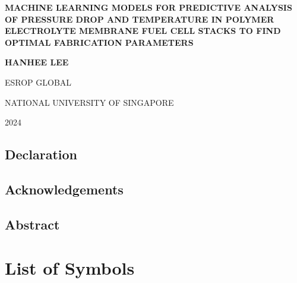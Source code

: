 \documentclass{report}
\begin{document}
\begin{titlepage}
    \centering

    {\Large \textbf{MACHINE LEARNING MODELS FOR PREDICTIVE ANALYSIS OF PRESSURE DROP AND TEMPERATURE IN POLYMER ELECTROLYTE MEMBRANE FUEL CELL STACKS TO FIND OPTIMAL FABRICATION PARAMETERS}}
    
    \vspace{5em}
    
    {\Large \textbf{HANHEE LEE}}
    
    \vfill
    
    {\Large ESROP GLOBAL}
    
    \vspace{1em} {\Large NATIONAL UNIVERSITY OF SINGAPORE}
    
    \vspace{1em} {\Large 2024}
    
\end{titlepage}


\begin{center}
    \section*{Declaration}
    
\end{center}

\begin{center}
    \newpage \section*{Acknowledgements}
    
\end{center}

\begin{center}
    \newpage \section*{Abstract}    
    
\end{center}

\newpage \tableofcontents

\newpage \listoffigures

\newpage \listoftables

\newpage \section{List of Symbols}
 
\end{document}
